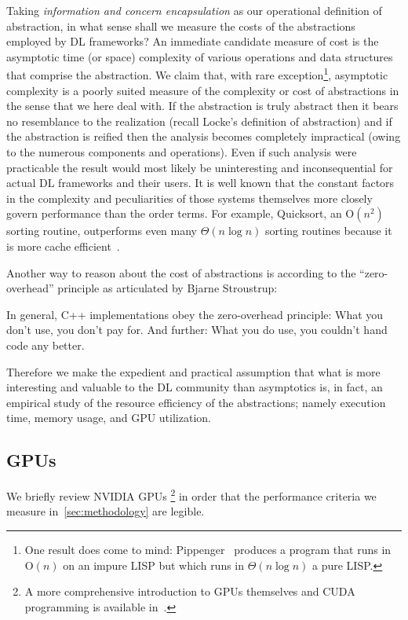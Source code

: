 Taking \textit{information and concern encapsulation} as our operational definition of abstraction, in what sense shall we measure the costs of the abstractions employed by DL frameworks?
An immediate candidate measure of cost is the asymptotic time (or space) complexity of various operations and data structures that comprise the abstraction.
We claim that, with rare exception\footnote{One result does come to mind: Pippenger~\cite{10.1145/244795.244798} produces a program that runs in O$(n)$ on an impure LISP but which runs in $\Theta(n \log n)$ a pure LISP\@.}, asymptotic complexity is a poorly suited measure of the complexity or cost of abstractions in the sense that we here deal with.
If the abstraction is truly abstract then it bears no resemblance to the realization (recall Locke's definition of abstraction) and if the abstraction is reified then the analysis becomes completely impractical (owing to the numerous components and operations).
Even if such analysis were practicable the result would most likely be uninteresting and inconsequential for actual DL frameworks and their users.
It is well known that the constant factors in the complexity and peculiarities of those systems themselves more closely govern performance than the order terms.
For example, Quicksort, an O$\left(n^2\right)$ sorting routine, outperforms even many $\Theta(n\log n)$ sorting routines because it is more cache efficient~\cite{10.5555/1410219}.

Another way to reason about the cost of abstractions is according to the ``zero-overhead'' principle as articulated by Bjarne Stroustrup:
\begin{displayquote}[\cite{10.1007/978-3-642-28869-2_1}]
    In general, C++ implementations obey the zero-overhead principle: What you don't use, you don't pay for.
    And further: What you do use, you couldn't hand code any better.
\end{displayquote}
Therefore we make the expedient and practical assumption that what is more interesting and valuable to the DL community than asymptotics is, in fact, an empirical study of the resource efficiency of the abstractions;
namely execution time, memory usage, and GPU utilization.



\subsection{GPUs}\label{subsec:gpus}

We briefly review NVIDIA GPUs%
\footnote{A more comprehensive introduction to GPUs themselves and CUDA programming is available in~\cite{10.5555/1891996}.}
in order that the performance criteria we measure in~\cref{sec:methodology} are legible.

